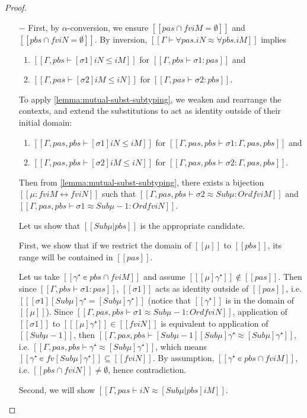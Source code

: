 \begin{proof}
    \hfill
  \begin{itemize}
    \item[$-$]
      First, by $\alpha$-conversion, we ensure $[[{pas} ∩ fv iM = ∅]]$ and $[[{pbs} ∩ fv iN = ∅]]$.
      By inversion, $[[Γ ⊢ ∀pas.iN ≈ ∀pbs.iM ]]$ implies 
      \begin{enumerate} 
        \item $[[Γ,pbs ⊢ [σ1]iN ≤ iM]]$ for $[[ Γ,pbs ⊢ σ1 : pas ]]$ and 
        \item $[[Γ,pas ⊢ [σ2]iM ≤ iN]]$ for $[[ Γ,pas ⊢ σ2 : pbs ]]$.
      \end{enumerate}
      To apply \cref{lemma:mutual-subst-subtyping}, we weaken 
      and rearrange the contexts, and extend the substitutions to act as identity
      outside of their initial domain:
      \begin{enumerate} 
        \item $[[Γ,pas,pbs ⊢ [σ1]iN ≤ iM]]$ for $[[ Γ,pas,pbs ⊢ σ1 : Γ,pas,pbs ]]$ and 
        \item $[[Γ,pas,pbs ⊢ [σ2]iM ≤ iN]]$ for $[[ Γ,pas,pbs ⊢ σ2 : Γ,pas,pbs ]]$.
      \end{enumerate}
      Then from \cref{lemma:mutual-subst-subtyping}, 
      there exists a bijection $[[μ : fv iM ↔ fv iN]]$ such that 
      $[[Γ,pas,pbs ⊢ σ2 ≈ Sub μ : Ord fv iM]]$ and 
      $[[Γ,pas,pbs ⊢ σ1 ≈ Sub μ-1 : Ord fv iN]]$. 

      Let us show that $[[Sub μ|{pbs}]]$ is the appropriate candidate.

      First, we show that if we restrict the domain of $[[μ]]$ to 
      $[[pbs]]$, its range will be contained in $[[pas]]$.

      Let us take $[[γ⁺ ∊ {pbs} ∩ fv iM]]$ and 
      assume $[[ [μ]γ⁺]] \notin [[pas]]$.
      Then since $[[ Γ,pbs ⊢ σ1 : pas ]]$, 
      $[[σ1]]$ acts as identity outside of $[[pas]]$, i.e.
      $[[ [σ1][Sub μ]γ⁺ = [Sub μ]γ⁺ ]]$ (notice that $[[γ⁺]]$ is in the domain of $[[μ]]$).
      Since
      $[[Γ,pas,pbs ⊢ σ1 ≈ Sub μ-1 : Ord fv iN]]$, 
      application of $[[σ1]]$ to $[[ [μ]γ⁺ ]] \in [[fv iN]]$
      is equivalent to application of $[[Sub μ-1]]$, then 
      $[[ Γ,pas,pbs ⊢ [Sub μ-1][Sub μ]γ⁺ ≈ [Sub μ]γ⁺ ]]$, i.e.
      $[[Γ,pas,pbs ⊢ γ⁺ ≈ [Sub μ]γ⁺]]$, 
      which means $[[γ⁺ ∊ fv [Sub μ]γ⁺]] \subseteq [[fv iN]]$.
      By assumption, $[[γ⁺ ∊ {pbs} ∩ fv iM]]$, i.e. $[[{pbs} ∩ fv iN]] \neq \emptyset$, hence contradiction.

      Second, 
      we will show $[[ Γ, pas ⊢ iN ≈ [Sub μ|{pbs}] iM ]]$.


\end{itemize}
\end{proof}

